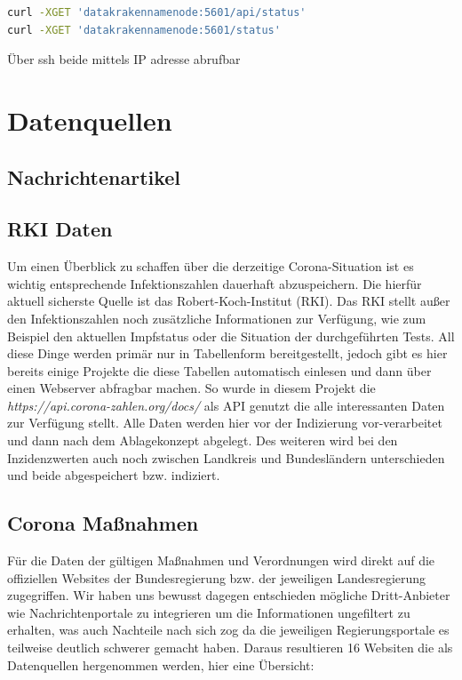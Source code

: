 \documentclass[12pt,oneside,a4paper,parskip]{scrbook}
\begin{document}
\begin{lstlisting}[caption=Statusabfrage Kibana,label=statuskibana,language=bash]
curl -XGET 'datakrakennamenode:5601/api/status'
curl -XGET 'datakrakennamenode:5601/status'
\end{lstlisting}

Über ssh beide mittels IP adresse abrufbar

\chapter{Datenquellen}
\section{Nachrichtenartikel}
\section{RKI Daten}
Um einen \"Uberblick zu schaffen \"uber die derzeitige Corona-Situation ist es wichtig entsprechende Infektionszahlen dauerhaft abzuspeichern. Die hierf\"ur aktuell sicherste Quelle ist das Robert-Koch-Institut (RKI). Das RKI stellt außer den Infektionszahlen noch zus\"atzliche Informationen zur Verf\"ugung, wie zum Beispiel den aktuellen Impfstatus oder die Situation der durchgef\"uhrten Tests.\newline
All diese Dinge werden prim\"ar nur in Tabellenform bereitgestellt, jedoch gibt es hier bereits einige Projekte die diese Tabellen automatisch einlesen und dann \"uber einen Webserver abfragbar machen. So wurde in diesem Projekt die \textit{https://api.corona-zahlen.org/docs/} als API genutzt die alle interessanten Daten zur Verf\"ugung stellt. \newline
Alle Daten werden hier vor der Indizierung vor-verarbeitet und dann nach dem Ablagekonzept abgelegt.
Des weiteren wird bei den Inzidenzwerten auch noch zwischen Landkreis und Bundesl\"andern unterschieden und beide abgespeichert bzw. indiziert.
\section{Corona Maßnahmen}
Für die Daten der gültigen Maßnahmen und Verordnungen wird direkt auf die offiziellen Websites der Bundesregierung bzw. der jeweiligen Landesregierung zugegriffen. Wir haben uns bewusst dagegen entschieden mögliche Dritt-Anbieter wie Nachrichtenportale zu integrieren um die Informationen ungefiltert zu erhalten, was auch Nachteile nach sich zog da die jeweiligen Regierungsportale es teilweise deutlich schwerer gemacht haben. Daraus resultieren 16 Websiten die als Datenquellen hergenommen werden, hier eine Übersicht:
\end{document}
